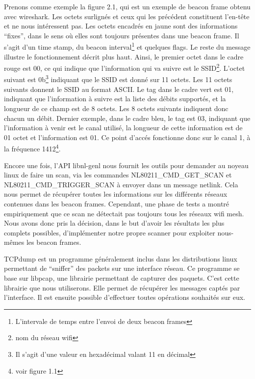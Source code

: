 Prenons comme exemple la figure 2.1, qui est un exemple de beacon frame obtenu avec wireshark. Les octets surlignés et ceux qui
les précédent constituent l'en-tête et ne nous intéressent pas. Les octets encadrés en jaune sont des informations ``fixes'', dans
le sens où elles sont toujours présentes dans une beacon frame. Il s'agit d'un time stamp, du beacon interval\footnote{L'intervale
de temps entre l'envoi de deux beacon frames} et quelques flags. Le reste du message illustre le fonctionnement décrit plus
haut. Ainsi, le premier octet dans le cadre rouge est 00, ce qui indique que l'information qui va suivre est le SSID\footnote{nom du
réseau wifi}. L'octet suivant est 0b\footnote{Il s'agit d'une valeur en hexadécimal valant 11 en décimal} indiquant que le SSID est
donné sur 11 octets. Les 11 octets suivants donnent le SSID au format ASCII. Le tag dans le cadre vert est 01, indiquant que 
l'information à suivre est la liste des débits supportés, et la longueur de ce champ est de 8 octets. Les 8 octets suivants indiquent
donc chacun un débit. Dernier exemple, dans le cadre bleu, le tag est 03, indiquant que l'information à venir est le canal utilisé, la 
longueur de cette information est de 01 octet et l'information est 01. Ce point d'accés fonctionne donc sur le canal 1, à la
fréquence 1412\footnote{voir figure 1.1}.

Encore une fois, l'API libnl-genl nous fournit les outils pour demander au noyeau linux de faire un scan, via les commandes
NL80211\_\-CMD\_\-GET\_\-SCAN et NL80211\_\-CMD\_\-TRIGGER\_\-SCAN à envoyer dans un message netlink. Cela nous permet de récupérer toutes les
informations sur les différents réseaux contenues dans les beacon frames. Cependant, une phase de tests a montré
empiriquement que ce scan ne détectait pas toujours tous les réseaux wifi mesh. Nous avons donc pris la décision, dans le but
d'avoir les résultats les plus complets possibles, d'implémenter notre propre scanner pour exploiter nous-mêmes les beacon frames.

TCPdump est un programme généralement inclus dans les distributions linux permettant de ``sniffer'' des packets sur une interface
réseau. Ce programme se base sur libpcap\cite{SCANlib}, une librairie permettant de capturer des paquets. C'est cette librairie que
nous utiliserons. Elle permet de récupérer les messages captés par l'interface. Il est ensuite possible
d'effectuer toutes opérations souhaités sur eux.

